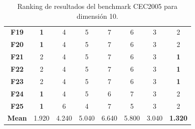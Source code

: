\begin{table}
\begin{tabular}{cccccccc}
		\textbf{F19}  &      \textbf{1} &      4 &      5 &      7 &      6 &      3 &      2 \\
		\textbf{F20}  &      \textbf{1} &      4 &      5 &      7 &      6 &      3 &      2 \\
		\textbf{F21}  &      2 &      4 &      5 &      7 &      6 &      3 &      \textbf{1} \\
		\textbf{F22}  &      2 &      4 &      5 &      7 &      6 &      3 &      \textbf{1} \\
		\textbf{F23}  &      2 &      4 &      5 &      7 &      6 &      3 &      \textbf{1} \\
		\textbf{F24}  &      \textbf{1} &      4 &      5 &      6 &      7 &      3 &      2 \\
		\textbf{F25}  &      \textbf{1} &      6 &      4 &      7 &      5 &      3 &      2 \\
		\textbf{Mean} &  1.920 &  4.240 &  5.040 &  6.640 &  5.800 &  3.040 &  \textbf{1.320} \\
		\bottomrule
	\end{tabular}
	\caption{Ranking de resultados del benchmark CEC2005 para dimensión 10.}
\end{table}

